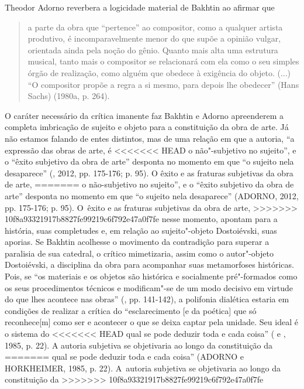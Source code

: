 {{Theodor Adorno reverbera a logicidade material de Bakhtin ao afirmar que

\begin{quote}
a parte da obra que ``pertence'' ao compositor, como a qualquer artista
produtivo, é incomparavelmente menor do que supõe a opinião vulgar,
orientada ainda pela noção do gênio. Quanto mais alta uma estrutura
musical, tanto mais o compositor se relacionará com ela como o seu
simples órgão de realização, como alguém que obedece à exigência do
objeto. (...) ``O compositor propõe a regra a si mesmo, para depois lhe
obedecer'' (Hans Sachs) (1980a, p. 264).
\end{quote}

O caráter necessário da crítica imanente faz Bakhtin e Adorno
apreenderem a completa imbricação de sujeito e objeto para a
constituição da obra de arte. Já não estamos falando de entes distintos,
mas de uma relação em que a autoria, ``a expressão das obras de arte, é
<<<<<<< HEAD
o não"-subjetivo no sujeito'', e o ``êxito subjetivo da obra de arte''
desponta no momento em que ``o sujeito nela desaparece'' (, 2012,
pp. 175-176; p. 95). O êxito e as fraturas subjetivas da obra de arte,
=======
o não-subjetivo no sujeito'', e o ``êxito subjetivo da obra de arte''
desponta no momento em que ``o sujeito nela desaparece'' (ADORNO, 2012,
pp. 175-176; p. 95). O~êxito e as fraturas subjetivas da obra de arte,
>>>>>>> 10f8a93321917b8827fe99219c6f792e47a0f7fe
nesse momento, apontam para a história, suas completudes e, em relação
ao sujeito"-objeto Dostoiévski, suas aporias. Se Bakhtin acolhesse o
movimento da contradição para superar a paralisia de sua catedral, o
crítico mimetizaria, assim como o autor"-objeto Dostoiévski, a disciplina
da obra para acompanhar suas metamorfoses históricas. Pois, se ``os
materiais e os objetos são histórica e socialmente pré"-formados como os
seus procedimentos técnicos e modificam"-se de um modo decisivo em
virtude do que lhes acontece nas obras'' (, pp. 141-142), a
polifonia dialética estaria em condições de realizar a crítica do
``esclarecimento {[}e da poética{]} que só reconhece{[}m{]} como ser e
acontecer o que se deixa captar pela unidade. Seu ideal é o sistema do
<<<<<<< HEAD
qual se pode deduzir toda e cada coisa'' ( e , 1985, p.
22). A autoria subjetiva se objetivaria ao longo da constituição da
=======
qual se pode deduzir toda e cada coisa'' (ADORNO e HORKHEIMER, 1985, p.
22). A~autoria subjetiva se objetivaria ao longo da constituição da
>>>>>>> 10f8a93321917b8827fe99219c6f792e47a0f7fe
}}
